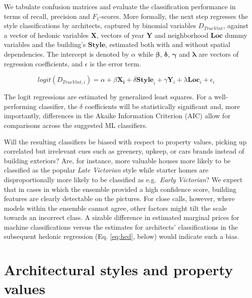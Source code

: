 \documentclass[]{article}
\begin{document}
We tabulate confusion matrices and evaluate the classification
performance in terms of recall, precision and \(F_1\)-scores. More
formally, the next step regresses the style classifications by
architects, captured by binomial variables \(D_{TrueVint}\), against a
vector of hedonic variables \(\mathbf{X}\), vectors of year
\(\mathbf{Y}\) and neighborhood \(\bm{Loc}\) dummy variables and the
building's \(\mathbf{Style}\), estimated both with and without spatial
dependencies. The intercept is denoted by \(\alpha\) while
\(\bm{\beta}\), \(\bm{\delta}\), \(\bm{\gamma}\) and \(\bm{\lambda}\)
are vectors of regression coefficients, and \(\epsilon\) is the error
term.

\begin{equation} \label{eq:rev}
  logit( D_{TrueVint,i} ) = \alpha + \beta\mathbf{X_i} + \delta\mathbf{Style}_i +  \gamma\mathbf{Y}_i + \lambda\mathbf{Loc}_i +  \epsilon_i
\end{equation}

The logit regressions are estimated by generalized least squares. For a
well-performing classifier, the \(\delta\) coefficients will be
statistically significant and, more importantly, differences in the
Akaike Information Criterion (AIC) allow for comparisons across the
suggested ML classifiers.

Will the resulting classifiers be biased with respect to property
values, picking up correlated but irrelevant cues such as greenery,
upkeep, or cars brands instead of building exteriors? Are, for instance,
more valuable houses more likely to be classified as the popular
\emph{Late Victorian} style while starter homes are disproportionally
more likely to be classified as e.g.~\emph{Early Victorian}? We expect
that in cases in which the ensemble provided a high confidence score,
building features are clearly detectable on the pictures. For close
calls, however, where models within the ensemble cannot agree, other
factors might tilt the scale towards an incorrect class. A sizable
difference in estimated marginal prices for machine classifications
versus the estimates for architects' classifications in the subsequent
hedonic regression (Eq. \ref{eq:hed}, below) would indicate such a bias.

\hypertarget{architectural-styles-and-property-values}{%
\section{Architectural styles and property
values}\label{architectural-styles-and-property-values}}
\end{document}
